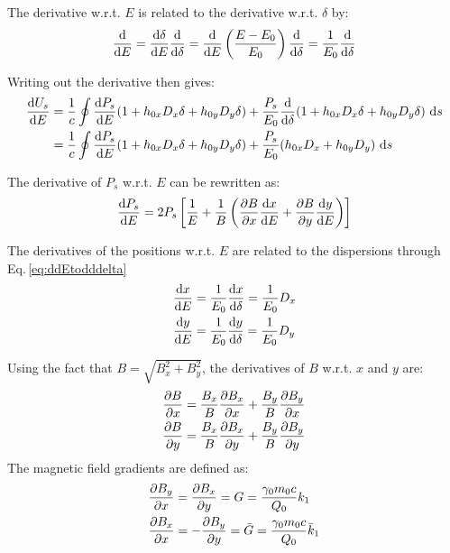 The derivative w.r.t. $E$ is related to the derivative w.r.t. $\delta$ by:
\begin{equation}
    \frac{\text{d} {}}{\text{d} {E}} = \frac{\text{d} {\delta}}{\text{d} {E}} \frac{\text{d} {}}{\text{d} {\delta}} = \frac{\text{d} {}}{\text{d} {E}} \left( \frac{E - E_0}{E_0} \right) \frac{\text{d} {}}{\text{d} {\delta}} = \frac{1}{E_0} \frac{\text{d} {}}{\text{d} {\delta}}
    \label{eq:ddEtodddelta}
\end{equation}

Writing out the derivative then gives:
\begin{align}
    \frac{\text{d} {U_s}}{\text{d} {E}} &= \frac{1}{c} \oint \frac{\text{d} {P_s}}{\text{d} {E}} (1 + h_{0x}D_x \delta + h_{0y} D_y \delta) + \frac{P_s}{E_0} \frac{\text{d} {}}{\text{d} {\delta}}(1 + h_{0x}D_x \delta + h_{0y} D_y \delta)\ \text{d} s \notag \\
                    &= \frac{1}{c} \oint \frac{\text{d} {P_s}}{\text{d} {E}} (1 + h_{0x}D_x \delta + h_{0y} D_y \delta) + \frac{P_s}{E_0} (h_{0x}D_x + h_{0y} D_y)\ \text{d} s
\end{align}

The derivative of $P_s$ w.r.t. $E$ can be rewritten as:
\begin{equation}
    \frac{\text{d} {P_s}}{\text{d} {E}} = 2 P_s \left[ \frac{1}{E} + \frac{1}{B} \left( \frac{\partial {B}}{\partial {x}} \frac{\text{d} {x}}{\text{d} {E}} + \frac{\partial {B}}{\partial {y}} \frac{\text{d} {y}}{\text{d} {E}} \right) \right]
\end{equation}

The derivatives of the positions w.r.t. $E$ are related to the dispersions through Eq.\,\ref{eq:ddEtodddelta}
\begin{align}
    \frac{\text{d} {x}}{\text{d} {E}} &= \frac{1}{E_0} \frac{\text{d} {x}}{\text{d} {\delta}} = \frac{1}{E_0} D_x\\
    \frac{\text{d} {y}}{\text{d} {E}} &= \frac{1}{E_0} \frac{\text{d} {y}}{\text{d} {\delta}} = \frac{1}{E_0} D_y
\end{align}

Using the fact that $B = \sqrt{B_x^2 + B_y^2}$, the derivatives of $B$ w.r.t. $x$ and $y$ are:
\begin{align}
    \frac{\partial {B}}{\partial {x}} &= \frac{B_x}{B} \frac{\partial {B_x}}{\partial {x}} + \frac{B_y}{B} \frac{\partial {B_y}}{\partial {x}}\\
    \frac{\partial {B}}{\partial {y}} &= \frac{B_x}{B} \frac{\partial {B_x}}{\partial {y}} + \frac{B_y}{B} \frac{\partial {B_y}}{\partial {y}}
\end{align}
The magnetic field gradients are defined as:
\begin{align}
    &\frac{\partial {B_y}}{\partial {x}} = \frac{\partial {B_x}}{\partial {y}}  = G       = \frac{\gamma_0 m_0 c}{Q_0} k_1\\
    &\frac{\partial {B_x}}{\partial {x}} = -\frac{\partial {B_y}}{\partial {y}} = \bar{G} = \frac{\gamma_0 m_0 c}{Q_0} \bar{k}_1
\end{align}

